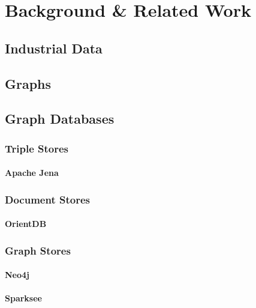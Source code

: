\chapter{Background \& Related Work}
\label{ch:Background}

\section{Industrial Data\label{se:industrialData}}

\section{Graphs\label{se:graphs}}

\section{Graph Databases\label{se:graphDatabases}}

\subsection{Triple Stores\label{subse:tipleStores}}

\subsubsection{Apache Jena\label{subse:apacheJena}}

\subsection{Document Stores\label{subse:documentStores}}

\subsubsection{OrientDB\label{subse:orientdb}}

\subsection{Graph Stores\label{subse:graphStores}}

\subsubsection{Neo4j\label{subse:neo4j}}

\subsubsection{Sparksee\label{subse:sparksee}}

